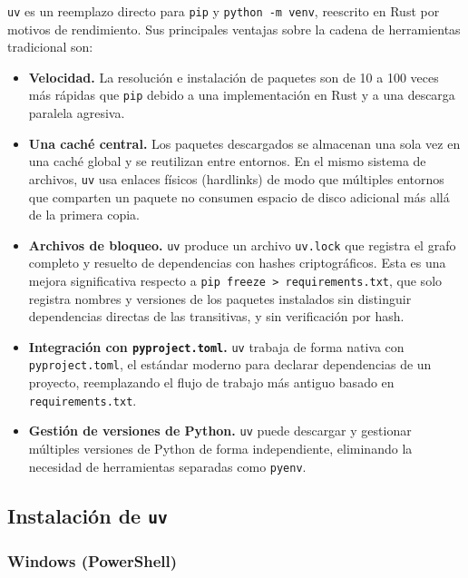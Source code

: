 \texttt{uv} es un reemplazo directo para \texttt{pip} y
\texttt{python -m venv}, reescrito en Rust por motivos de rendimiento. Sus
principales ventajas sobre la cadena de herramientas tradicional son:

\begin{itemize}
  \item \textbf{Velocidad.} La resolución e instalación de paquetes son
        de 10 a 100 veces más rápidas que \texttt{pip} debido a una
        implementación en Rust y a una descarga paralela agresiva.
  \item \textbf{Una caché central.} Los paquetes descargados se almacenan
        una sola vez en una caché global y se reutilizan entre entornos.
        En el mismo sistema de archivos, \texttt{uv} usa enlaces físicos
        (hardlinks) de modo que múltiples entornos que comparten un
        paquete no consumen espacio de disco adicional más allá de la
        primera copia.
  \item \textbf{Archivos de bloqueo.} \texttt{uv} produce un archivo
        \texttt{uv.lock} que registra el grafo completo y resuelto de
        dependencias con hashes criptográficos. Esta es una mejora
        significativa respecto a \texttt{pip freeze > requirements.txt},
        que solo registra nombres y versiones de los paquetes instalados
        sin distinguir dependencias directas de las transitivas, y sin
        verificación por hash.
  \item \textbf{Integración con \texttt{pyproject.toml}.} \texttt{uv}
        trabaja de forma nativa con \texttt{pyproject.toml}, el estándar
        moderno para declarar dependencias de un proyecto, reemplazando
        el flujo de trabajo más antiguo basado en \texttt{requirements.txt}.
  \item \textbf{Gestión de versiones de Python.} \texttt{uv} puede
        descargar y gestionar múltiples versiones de Python de forma
        independiente, eliminando la necesidad de herramientas separadas
        como \texttt{pyenv}.
\end{itemize}

\subsection{Instalación de \texttt{uv}}

\subsubsection{Windows (PowerShell)}

